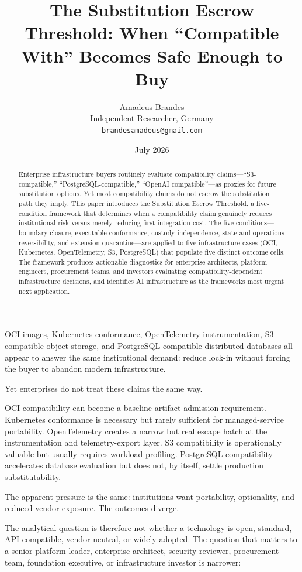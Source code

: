 \documentclass[11pt]{article}
\title{\textbf{The Substitution Escrow Threshold: When ``Compatible With'' Becomes Safe Enough to Buy}}
\author{Amadeus Brandes\\
Independent Researcher, Germany\\
\texttt{brandesamadeus@gmail.com}}
\date{July 2026}
\begin{document}
\maketitle
\thispagestyle{plain}
\begin{abstract}
Enterprise infrastructure buyers routinely evaluate compatibility claims---``S3-compatible,'' ``PostgreSQL-compatible,'' ``OpenAI compatible''---as proxies for future substitution options. Yet most compatibility claims do not escrow the substitution path they imply. This paper introduces the Substitution Escrow Threshold, a five-condition framework that determines when a compatibility claim genuinely reduces institutional risk versus merely reducing first-integration cost. The five conditions---boundary closure, executable conformance, custody independence, state and operations reversibility, and extension quarantine---are applied to five infrastructure cases (OCI, Kubernetes, OpenTelemetry, S3, PostgreSQL) that populate five distinct outcome cells. The framework produces actionable diagnostics for enterprise architects, platform engineers, procurement teams, and investors evaluating compatibility-dependent infrastructure decisions, and identifies AI infrastructure as the framework\textquotesingle s most urgent next application.
\end{abstract}

OCI images, Kubernetes conformance, OpenTelemetry instrumentation, S3-compatible object storage, and PostgreSQL-compatible distributed databases all appear to answer the same institutional demand: reduce lock-in without forcing the buyer to abandon modern infrastructure.

Yet enterprises do not treat these claims the same way.

OCI compatibility can become a baseline artifact-admission requirement. Kubernetes conformance is necessary but rarely sufficient for managed-service portability. OpenTelemetry creates a narrow but real escape hatch at the instrumentation and telemetry-export layer. S3 compatibility is operationally valuable but usually requires workload profiling. PostgreSQL compatibility accelerates database evaluation but does not, by itself, settle production substitutability.

The apparent pressure is the same: institutions want portability, optionality, and reduced vendor exposure. The outcomes diverge.

The analytical question is therefore not whether a technology is open, standard, API-compatible, vendor-neutral, or widely adopted. The question that matters to a senior platform leader, enterprise architect, security reviewer, procurement team, foundation executive, or infrastructure investor is narrower:
\end{document}
